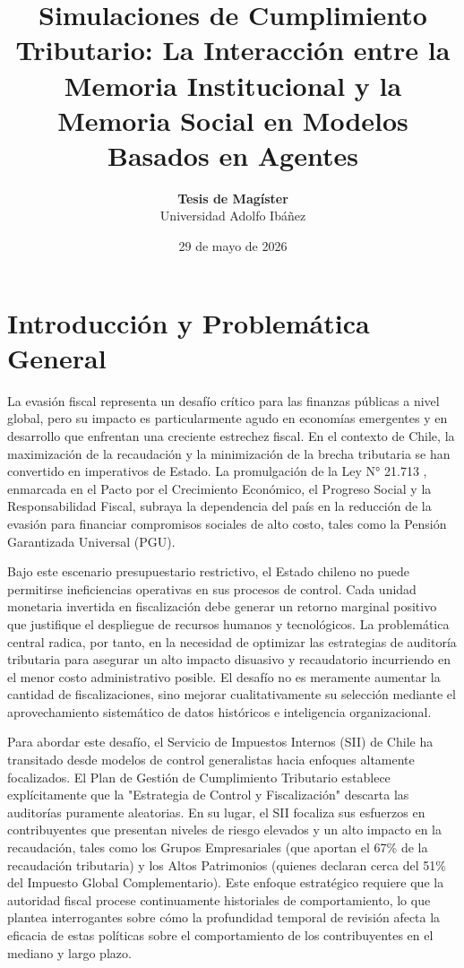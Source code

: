 \documentclass[twocolumn,10pt,letterpaper]{article}
\title{\vspace{-1.5cm}\Large\bfseries Simulaciones de Cumplimiento Tributario: La Interacción entre la Memoria Institucional y la Memoria Social en Modelos Basados en Agentes}
\author{
    \textbf{Tesis de Magíster}\\
    Universidad Adolfo Ibáñez
}
\date{29 de mayo de 2026}
\begin{document}
\maketitle

\section{Introducción y Problemática General}

La evasión fiscal representa un desafío crítico para las finanzas públicas a nivel global, pero su impacto es particularmente agudo en economías emergentes y en desarrollo que enfrentan una creciente estrechez fiscal. En el contexto de Chile, la maximización de la recaudación y la minimización de la brecha tributaria se han convertido en imperativos de Estado. La promulgación de la Ley N° 21.713 \parencite{ley2024cumplimiento}, enmarcada en el Pacto por el Crecimiento Económico, el Progreso Social y la Responsabilidad Fiscal, subraya la dependencia del país en la reducción de la evasión para financiar compromisos sociales de alto costo, tales como la Pensión Garantizada Universal (PGU). 

Bajo este escenario presupuestario restrictivo, el Estado chileno no puede permitirse ineficiencias operativas en sus procesos de control. Cada unidad monetaria invertida en fiscalización debe generar un retorno marginal positivo que justifique el despliegue de recursos humanos y tecnológicos. La problemática central radica, por tanto, en la necesidad de optimizar las estrategias de auditoría tributaria para asegurar un alto impacto disuasivo y recaudatorio incurriendo en el menor costo administrativo posible. El desafío no es meramente aumentar la cantidad de fiscalizaciones, sino mejorar cualitativamente su selección mediante el aprovechamiento sistemático de datos históricos e inteligencia organizacional.

Para abordar este desafío, el Servicio de Impuestos Internos (SII) de Chile ha transitado desde modelos de control generalistas hacia enfoques altamente focalizados. El Plan de Gestión de Cumplimiento Tributario \parencite{sii2026pgct} establece explícitamente que la "Estrategia de Control y Fiscalización" descarta las auditorías puramente aleatorias. En su lugar, el SII focaliza sus esfuerzos en contribuyentes que presentan niveles de riesgo elevados y un alto impacto en la recaudación, tales como los Grupos Empresariales (que aportan el 67\% de la recaudación tributaria) y los Altos Patrimonios (quienes declaran cerca del 51\% del Impuesto Global Complementario). Este enfoque estratégico requiere que la autoridad fiscal procese continuamente historiales de comportamiento, lo que plantea interrogantes sobre cómo la profundidad temporal de revisión afecta la eficacia de estas políticas sobre el comportamiento de los contribuyentes en el mediano y largo plazo.
\end{document}

